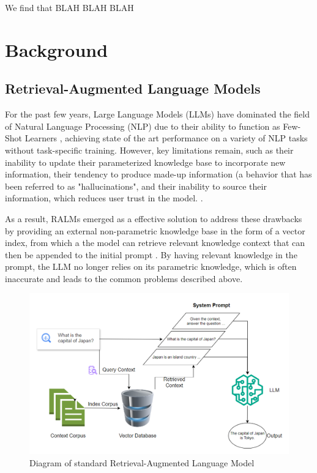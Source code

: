 \documentclass[11pt]{article}
\begin{document}
We find that BLAH BLAH BLAH
 
\section{Background}
\subsection{Retrieval-Augmented Language Models}
For the past few years, Large Language Models (LLMs) have dominated the field of Natural Language Processing (NLP) due to their ability to function as Few-Shot Learners \cite{brown2020language}, achieving state of the art performance on a variety of NLP tasks without task-specific training. However, key limitations remain, such as their inability to update their parameterized knowledge base to incorporate new information, their tendency to produce made-up information (a behavior that has been referred to as "hallucinations", and their inability to source their information, which reduces user trust in the model. \cite{lewis2021retrievalaugmented, huang2023survey}. 

As a result, RALMs emerged as a effective solution to address these drawbacks by providing an external non-parametric knowledge base in the form of a vector index, from which a the model can retrieve relevant knowledge context that can then be appended to the initial prompt \cite{lewis2021retrievalaugmented}. By having relevant knowledge in the prompt, the LLM no longer relies on its parametric knowledge, which is often inaccurate and leads to the common problems described above.

\begin{figure}
    \centering
    \includegraphics[width=1\linewidth]{overleaf/rag_diagram.png}
    \caption{Diagram of standard Retrieval-Augmented Language Model}
    \label{fig:enter-label}
\end{figure}
\end{document}
